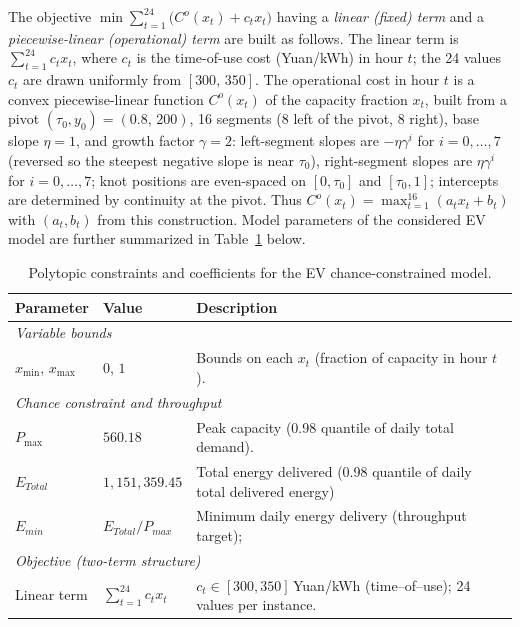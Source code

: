 \documentclass[opre,sglanonrev]{informs4}
\begin{document}
{\begin{APPENDICES}
The objective $\min \sum_{t=1}^{24} \bigl( C^o(x_t) + c_t x_t \bigr)$ having a \emph{linear (fixed) term} and a \emph{piecewise-linear (operational) term} are built as follows. The linear term is $\sum_{t=1}^{24} c_t x_t$, where $c_t$ is the time-of-use cost (Yuan/kWh) in hour $t$; the 24 values $c_t$ are drawn uniformly from $[300,\,350]$. The operational cost in hour $t$ is a convex piecewise-linear function $C^o(x_t)$ of the capacity fraction $x_t$, built from a pivot $(\tau_0, y_0) = (0.8,\,200)$, 16 segments (8 left of the pivot, 8 right), base slope $\eta = 1$, and growth factor $\gamma = 2$: left-segment slopes are $-\eta \gamma^i$ for $i=0,\ldots,7$ (reversed so the steepest negative slope is near $\tau_0$), right-segment slopes are $\eta \gamma^i$ for $i=0,\ldots,7$; knot positions are even-spaced on $[0,\tau_0]$ and $[\tau_0,1]$; intercepts are determined by continuity at the pivot. Thus $C^o(x_t) = \max_{t=1}^{16}(a_t x_t + b_t)$ with $(a_t,b_t)$ from this construction. Model parameters of the considered EV model are further summarized in Table~\ref{tab:ev-master-params} below.

\begin{table}[!hbtp]
\centering
\scriptsize
\caption{Polytopic constraints and coefficients for the EV chance-constrained model.}
\label{tab:ev-master-params}
\renewcommand{\arraystretch}{1.0}
\begin{tabular}{p{2.0cm} p{4.5cm} p{8.5cm}}
\toprule
\textbf{Parameter} & \textbf{Value} & \textbf{Description} \\
\midrule

\multicolumn{3}{l}{\textit{Variable bounds}} \\[2pt]
$x_{\min}$, $x_{\max}$ 
    & $0$, $1$ 
    & Bounds on each $x_t$ (fraction of capacity in hour $t$). \\
\midrule
\multicolumn{3}{l}{\textit{Chance constraint and throughput}} \\[2pt]
$P_{\max}$ 
    & $560.18$
    & Peak capacity (0.98 quantile of daily total demand). \\[6pt]

$E_{Total}$ 
    & $1{,}151{,}359.45$
    & Total energy delivered (0.98 quantile of daily total delivered energy)\\

$E_{min}$
    & $E_{Total}/P_{max}$ 
    &  Minimum daily energy delivery (throughput target); \\

\midrule
\multicolumn{3}{l}{\textit{Objective (two-term structure)}} \\[2pt]
Linear term
    & $\sum_{t=1}^{24} c_t x_t$
    & $c_t\in[300,350]$\,Yuan/kWh (time–of–use); 24 values per instance. \\[6pt]


\end{tabular}
\end{table}
\end{APPENDICES}}
\end{document}
